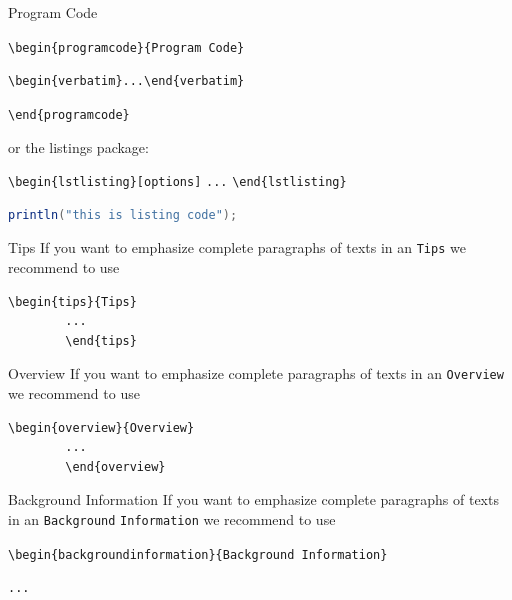 \begin{bibunit}
	\begin{programcode}{Program Code}
		
		\verb|\begin{programcode}{Program Code}|
		
		\verb|\begin{verbatim}...\end{verbatim}|
		
		\verb|\end{programcode}|
		
		or the listings package:
		
		\verb|\begin{lstlisting}[options]|
		\verb|...|
		\verb|\end{lstlisting}|
		
	\end{programcode}
	
	\begin{lstlisting}[language=Java,frame=single,caption={Sample Java Code},captionpos=b,label={01:listing:1}]
	println("this is listing code");
	\end{lstlisting}
	
	\begin{tips}{Tips}
		If you want to emphasize complete paragraphs of texts in an \verb|Tips| we recommend to
		use  \begin{verbatim}\begin{tips}{Tips}
		...
		\end{tips}\end{verbatim}
	\end{tips}
	
	
	\begin{overview}{Overview}
		If you want to emphasize complete paragraphs of texts in an \verb|Overview| we recommend to
		use  \begin{verbatim}\begin{overview}{Overview}
		...
		\end{overview}\end{verbatim}
	\end{overview}
	\begin{backgroundinformation}{Background Information}
		If you want to emphasize complete paragraphs of texts in an \verb|Background|
		\verb|Information| we recommend to
		use
		
		\verb|\begin{backgroundinformation}{Background Information}|
		
		\verb|...|
		

\end{backgroundinformation}
\end{bibunit}
